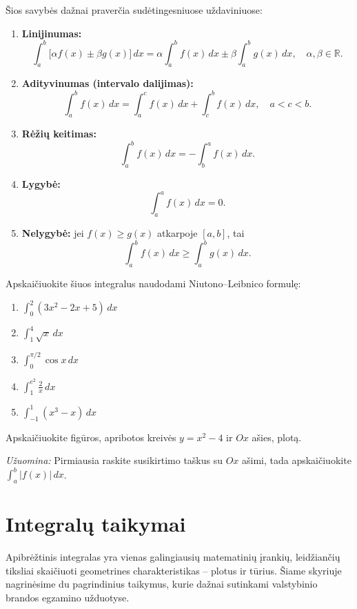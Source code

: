 Šios savybės dažnai praverčia sudėtingesniuose uždaviniuose:

\begin{enumerate}
    \item \textbf{Linijinumas:}
    \[
    \int_a^b \bigl[\alpha f(x) \pm \beta g(x)\bigr]\,dx 
    = \alpha\int_a^b f(x)\,dx \pm \beta\int_a^b g(x)\,dx,
    \quad \alpha, \beta \in \mathbb{R}.
    \]
    \item \textbf{Adityvinumas (intervalo dalijimas):}
    \[
    \int_a^b f(x)\,dx = \int_a^c f(x)\,dx + \int_c^b f(x)\,dx, \quad a < c < b.
    \]
    \item \textbf{Rėžių keitimas:}
    \[
    \int_a^b f(x)\,dx = -\int_b^a f(x)\,dx.
    \]
    \item \textbf{Lygybė:}
    \[
    \int_a^a f(x)\,dx = 0.
    \]
    \item \textbf{Nelygybė:} jei $f(x) \geq g(x)$ atkarpoje $[a,b]$, tai
    \[
    \int_a^b f(x)\,dx \geq \int_a^b g(x)\,dx.
    \]
\end{enumerate}

\begin{exercise}
Apskaičiuokite šiuos integralus naudodami Niutono–Leibnico formulę:
\begin{enumerate}[label=\alph*)]
    \item $\displaystyle\int_0^2 (3x^2 - 2x + 5)\,dx$
    \item $\displaystyle\int_1^4 \sqrt{x}\,dx$
    \item $\displaystyle\int_0^{\pi/2} \cos x\,dx$
    \item $\displaystyle\int_1^{e^2} \frac{2}{x}\,dx$
    \item $\displaystyle\int_{-1}^{1} (x^3 - x)\,dx$
\end{enumerate}
\end{exercise}

\begin{exercise}
Apskaičiuokite figūros, apribotos kreivės $y = x^2 - 4$ ir $Ox$ ašies, plotą.

\textit{Užuomina:} Pirmiausia raskite susikirtimo taškus su $Ox$ ašimi, 
tada apskaičiuokite $\displaystyle\int_a^b |f(x)|\,dx$.
\end{exercise}


\section{Integralų taikymai}

Apibrėžtinis integralas yra vienas galingiausių matematinių įrankių, leidžiančių tiksliai skaičiuoti geometrines charakteristikas – plotus ir tūrius. Šiame skyriuje nagrinėsime du pagrindinius taikymus, kurie dažnai sutinkami valstybinio brandos egzamino užduotyse.

